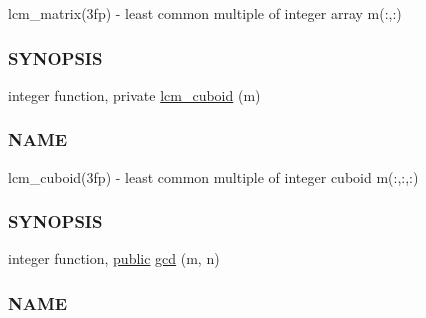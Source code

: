 \begin{DoxyCompactItemize}
\begin{DoxyCompactList}
lcm\+\_\+matrix(3fp) -\/ least common multiple of integer array m(\+:,\+:) \subsubsection*{S\+Y\+N\+O\+P\+S\+IS}\end{DoxyCompactList}\item 
integer function, private \hyperlink{namespacem__factor_ae9aed0802e2c5a923b255f143ddf6e15}{lcm\+\_\+cuboid} (m)
\begin{DoxyCompactList}\small\item\em \subsubsection*{N\+A\+ME}

lcm\+\_\+cuboid(3fp) -\/ least common multiple of integer cuboid m(\+:,\+:,\+:) \subsubsection*{S\+Y\+N\+O\+P\+S\+IS}\end{DoxyCompactList}\item 
integer function, \hyperlink{M__stopwatch_83_8txt_a2f74811300c361e53b430611a7d1769f}{public} \hyperlink{namespacem__factor_a69e8c33eff58fc447cfb8d4f3d4fae77}{gcd} (m, n)
\begin{DoxyCompactList}\small\item\em \subsubsection*{N\+A\+ME}


\end{DoxyCompactList}
\end{DoxyCompactItemize}
